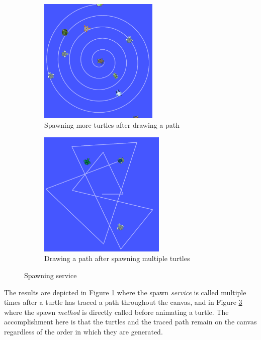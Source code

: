     \begin{figure}[hb]
            \centering
            \begin{subfigure}{.5\textwidth}
                \centering
                \includegraphics[height=6cm]{Images/03_spawnService.png}
                \caption{Spawning more turtles after drawing a path}
                \label{fig:spawnSrv}
            \end{subfigure}%
            \begin{subfigure}{.5\textwidth}
                \centering
                \includegraphics[height=6cm]{Images/03_multiTurtle.png}
                \caption{Drawing a path after spawning multiple turtles}
                \label{fig:multiTurtle}
            \end{subfigure}
            \caption{Spawning service}
    \end{figure}
    
        The results are depicted in Figure \ref{fig:spawnSrv} where the spawn \textit{service} is called multiple times after a turtle has traced a path throughout the canvas, and in Figure \ref{fig:multiTurtle} where the spawn \textit{method} is directly called before animating a turtle. The accomplishment here is that the turtles and the traced path remain on the canvas regardless of the order in which they are generated.
    
